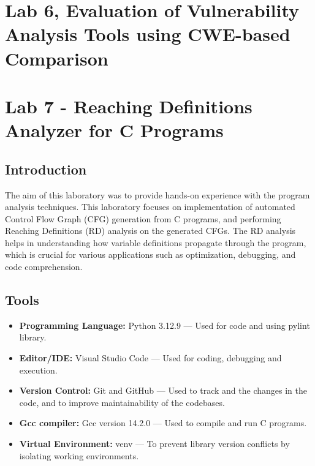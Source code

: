\documentclass[12pt, a4paper]{report}
\begin{document}
\chapter{Lab 6, Evaluation of Vulnerability Analysis Tools using CWE-based Comparison}



\chapter{Lab 7 - Reaching Definitions Analyzer for C Programs}
\section{Introduction}

The aim of this laboratory was to provide hands-on experience with the program analysis techniques. This laboratory focuses on implementation of automated Control Flow Graph (CFG) generation from C programs, and performing Reaching Definitions (RD) analysis on the generated CFGs. The RD analysis helps in understanding how variable definitions propagate through the program, which is crucial for various applications such as optimization, debugging, and code comprehension.
\
\section{Tools}

\begin{itemize}
    \item \textbf{Programming Language:} Python 3.12.9 --- Used for code and using pylint library.
    \item \textbf{Editor/IDE:} Visual Studio Code --- Used for coding, debugging and execution.
    \item \textbf{Version Control:} Git and GitHub --- Used to track and the changes in the code, and to improve maintainability of the codebases.
    \item \textbf{Gcc compiler:} Gcc version 14.2.0 --- Used to compile and run C programs.
    \item \textbf{Virtual Environment:} venv --- To prevent library version conflicts by isolating working environments.
\end{itemize}
\end{document}
